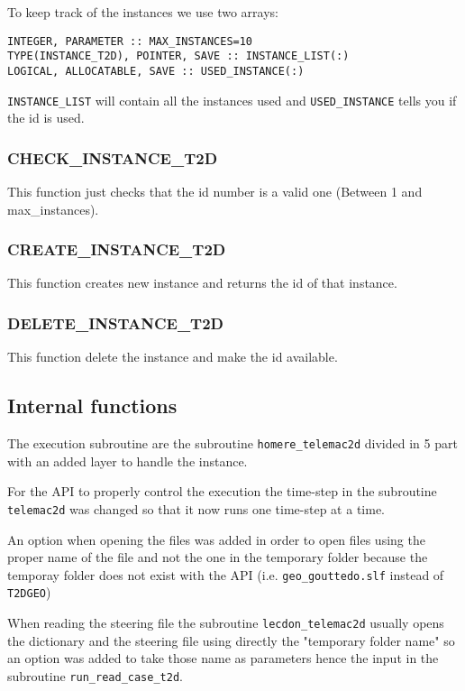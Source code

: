 To keep track of the instances we use two arrays:
\begin{lstlisting}
INTEGER, PARAMETER :: MAX_INSTANCES=10
TYPE(INSTANCE_T2D), POINTER, SAVE :: INSTANCE_LIST(:) 
LOGICAL, ALLOCATABLE, SAVE :: USED_INSTANCE(:)
\end{lstlisting}

\verb!INSTANCE_LIST! will contain all the instances used and
\verb!USED_INSTANCE! tells you if the id is used.
%
\subsubsection{CHECK\_INSTANCE\_T2D}
%
This function just checks that the id number is a valid one (Between 1 and
max\_instances).
%
\subsubsection{CREATE\_INSTANCE\_T2D}
%
This function creates new instance and returns the id of that instance.
%
\subsubsection{DELETE\_INSTANCE\_T2D}
%
This function delete the instance and make the id available.
%
\subsection{Internal functions}
%
The execution subroutine are the subroutine \verb!homere_telemac2d! divided in 5
part with an added layer to handle the instance.

For the API to properly control the execution the time-step in the subroutine
\verb!telemac2d! was changed so that it now runs one time-step at a time.

An option when opening the files was added in order to open files using the
proper name of the file and not the one in the temporary folder because the
temporay folder does not exist with the API (i.e. \verb!geo_gouttedo.slf!
instead of \verb!T2DGEO!)

When reading the steering file the subroutine \verb!lecdon_telemac2d! usually
opens the dictionary and the steering file using directly the "temporary folder
name" so an option was added to take those name as parameters hence the input in
the subroutine \verb!run_read_case_t2d!.

%
